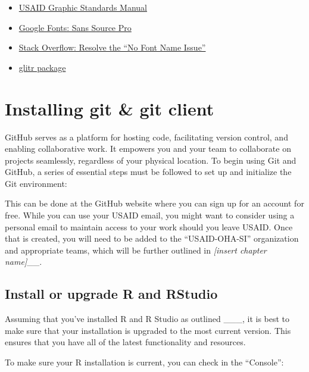 \documentclass[
  letterpaper,
  DIV=11,
  numbers=noendperiod]{scrreprt}
\providecommand{\tightlist}{%
  \setlength{\itemsep}{0pt}\setlength{\parskip}{0pt}}\usepackage{longtable,booktabs,array}
\begin{document}
\begin{itemize}
\tightlist
\item
  \href{https://www.usaid.gov/branding/gsm}{USAID Graphic Standards
  Manual}
\item
  \href{https://fonts.google.com/specimen/Source+Sans+Pro}{Google Fonts:
  Sans Source Pro}
\item
  \href{https://stackoverflow.com/questions/61204259/how-can-i-resolve-the-no-font-name-issue-when-importing-fonts-into-r-using-ext/68642855\#68642855}{Stack
  Overflow: Resolve the ``No Font Name Issue''}
\item
  \href{https://usaid-oha-si.github.io/glitr/}{glitr package}
\end{itemize}

\hypertarget{installing-git-git-client}{%
\chapter{Installing git \& git client}\label{installing-git-git-client}}

GitHub serves as a platform for hosting code, facilitating version
control, and enabling collaborative work. It empowers you and your team
to collaborate on projects seamlessly, regardless of your physical
location. To begin using Git and GitHub, a series of essential steps
must be followed to set up and initialize the Git environment:

This can be done at the GitHub website where you can sign up for an
account for free. While you can use your USAID email, you might want to
consider using a personal email to maintain access to your work should
you leave USAID. Once that is created, you will need to be added to the
``USAID-OHA-SI'' organization and appropriate teams, which will be
further outlined in \emph{{[}insert chapter name{]}}\_\_.

\hypertarget{install-or-upgrade-r-and-rstudio}{%
\section{Install or upgrade R and
RStudio}\label{install-or-upgrade-r-and-rstudio}}

Assuming that you've installed R and R Studio as outlined \_\_\_, it is
best to make sure that your installation is upgraded to the most current
version. This ensures that you have all of the latest functionality and
resources.

To make sure your R installation is current, you can check in the
``Console'':
\end{document}
